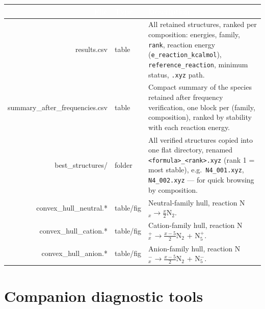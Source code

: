 \documentclass[11pt,a4paper]{article}
\begin{document}
\begin{longtable}{D p{2cm} T}
\toprule
{}\textcolor{white}{\bfseries File} & \textcolor{white}{\bfseries Type} & \textcolor{white}{\bfseries Description} \\
\midrule\endhead
results.csv & table & All retained structures, ranked per composition: energies, family, \texttt{rank}, reaction energy (\texttt{e\_reaction\_kcalmol}), \texttt{reference\_reaction}, minimum status, \texttt{.xyz} path. \\
summary\_after\_frequencies.csv & table & Compact summary of the species retained after frequency verification, one block per (family, composition), ranked by stability with each reaction energy. \\
best\_structures/ & folder & All verified structures copied into one flat directory, renamed \texttt{<formula>\_<rank>.xyz} (rank 1 = most stable), e.g.\ \texttt{N4\_001.xyz}, \texttt{N4\_002.xyz} --- for quick browsing by composition. \\
convex\_hull\_neutral.* & table/fig & Neutral-family hull, reaction N$_x \to \tfrac{x}{2}$N$_2$. \\
convex\_hull\_cation.* & table/fig & Cation-family hull, reaction N$_x^+ \to \tfrac{x-5}{2}$N$_2$ + N$_5^+$. \\
convex\_hull\_anion.* & table/fig & Anion-family hull, reaction N$_x^- \to \tfrac{x-5}{2}$N$_2$ + N$_5^-$. \\
\bottomrule
\end{longtable}

\section{Companion diagnostic tools}
\end{document}
